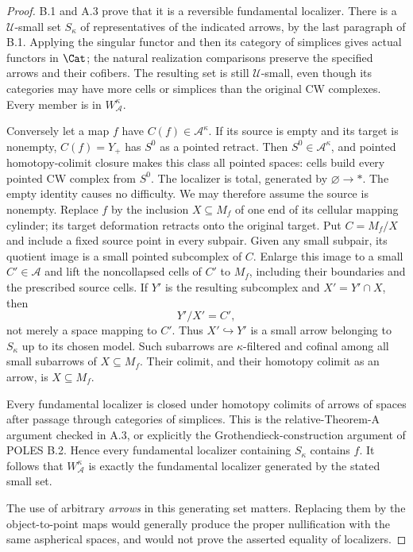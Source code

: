 \begin{proof}
B.1 and A.3 prove that it is a reversible fundamental localizer. There is a $\mathcal U$-small set $S_\kappa$ of representatives of the indicated arrows, by the last paragraph of B.1. Applying the singular functor and then its category of simplices gives actual functors in $\Cat$; the natural realization comparisons preserve the specified arrows and their cofibers. The resulting set is still $\mathcal U$-small, even though its categories may have more cells or simplices than the original CW complexes. Every member is in $W^\kappa_{\mathcal A}$.

Conversely let a map $f$ have $C(f)\in\mathcal A^\kappa$. If its source is empty and its target is nonempty, $C(f)=Y_+$ has $S^0$ as a pointed retract. Then $S^0\in\mathcal A^\kappa$, and pointed homotopy-colimit closure makes this class all pointed spaces: cells build every pointed CW complex from $S^0$. The localizer is total, generated by $\varnothing\to *$. The empty identity causes no difficulty. We may therefore assume the source is nonempty. Replace $f$ by the inclusion $X\subseteq M_f$ of one end of its cellular mapping cylinder; its target deformation retracts onto the original target. Put $C=M_f/X$ and include a fixed source point in every subpair. Given any small subpair, its quotient image is a small pointed subcomplex of $C$. Enlarge this image to a small $C'\in\mathcal A$ and lift the noncollapsed cells of $C'$ to $M_f$, including their boundaries and the prescribed source cells. If $Y'$ is the resulting subcomplex and $X'=Y'\cap X$, then
\[
 Y'/X'=C',
\]
not merely a space mapping to $C'$. Thus $X'\hookrightarrow Y'$ is a small arrow belonging to $S_\kappa$ up to its chosen model. Such subarrows are $\kappa$-filtered and cofinal among all small subarrows of $X\subseteq M_f$. Their colimit, and their homotopy colimit as an arrow, is $X\subseteq M_f$.

Every fundamental localizer is closed under homotopy colimits of arrows of spaces after passage through categories of simplices. This is the relative-Theorem-A argument checked in A.3, or explicitly the Grothendieck-construction argument of POLES B.2. Hence every fundamental localizer containing $S_\kappa$ contains $f$. It follows that $W^\kappa_{\mathcal A}$ is exactly the fundamental localizer generated by the stated small set.

The use of arbitrary \emph{arrows} in this generating set matters. Replacing them by the object-to-point maps would generally produce the proper nullification with the same aspherical spaces, and would not prove the asserted equality of localizers.
\end{proof}

